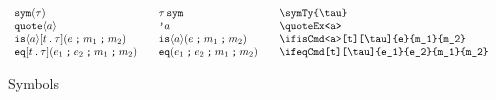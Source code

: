 \documentclass[11pt]{article}
\begin{document}
\begin{figure}
  
  \begin{small}
    \begin{displaymath}
      \begin{array}{l@{\qquad}l@{\qquad}l@{\qquad}l}
        \symTy{\tau}               & \symTy*{\tau}              & \verb|\symTy{\tau}|                \\
        \quoteEx<a>                & \quoteEx*<a>               & \verb|\quoteEx<a>|                 \\
        \ifisCmd<a>[t][\tau]{e}{m_1}{m_2} & \ifisCmd*<a>{e}{m_1}{m_2}  & \verb|\ifisCmd<a>[t][\tau]{e}{m_1}{m_2}| \\
        \ifeqCmd[t][\tau]{e_1}{e_2}{m_1}{m_2} & \ifeqCmd*{e_1}{e_2}{m_1}{m_2} & \verb|\ifeqCmd[t][\tau]{e_1}{e_2}{m_1}{m_2}|
      \end{array}
    \end{displaymath}
  \end{small}

  \caption{Symbols}
  \label{fig:sym}
\end{figure}
\end{document}
